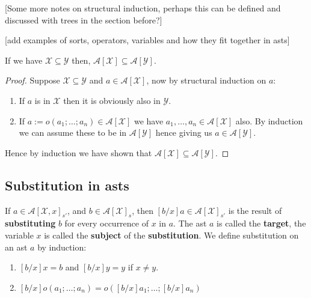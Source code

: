 [Some more notes on structural induction, perhaps this can be defined and discussed with trees in the section before?]

[add examples of sorts, operators, variables and how they fit together in asts]

\begin{lemma}
    If we have $\mathcal{X} \subseteq \mathcal{Y}$ then, $\mathcal{A}[\mathcal{X}] \subseteq \mathcal{A}[\mathcal{Y}]$.
\end{lemma}
\begin{proof}
    Suppose $\mathcal{X} \subseteq \mathcal{Y}$ and $a \in \mathcal{A}[\mathcal{X}]$, now by structural induction on $a$:
    
    \begin{enumerate}
        \item If $a$ is in $\mathcal{X}$ then it is obviously also in $\mathcal{Y}$.
        \item If $a := o(a_1;\dots;a_n) \in \mathcal{A}[\mathcal{X}]$ we have $a_1, \dots, a_n\in \mathcal{A}[\mathcal{X}]$ also. By induction we can assume these to be in $\mathcal{A}[\mathcal{Y}]$ hence giving us $a \in \mathcal{A}[\mathcal{Y}]$.
    \end{enumerate}
    
    Hence by induction we have shown that $\mathcal{A}[\mathcal{X}] \subseteq \mathcal{A}[\mathcal{Y}]$.
\end{proof}

\subsection{Substitution in asts}

\begin{defin}[Substitution]\label{sub}
    If $a \in \mathcal{A}[\mathcal{X},x]_{s'}$, and $b \in \mathcal{A}[\mathcal{X}]_s$, then $[b/x]a \in \mathcal{A}[\mathcal{X}]_{s'}$ is the result of \textbf{substituting} $b$ for every occurrence of $x$ in $a$. The ast $a$ is called the \textbf{target}, the variable $x$ is called the \textbf{subject} of the \textbf{substitution}. We define substitution on an ast $a$ by induction:
    \begin{enumerate}
        \item $[b/x]x = b$ and $[b/x]y = y$ if $x\ne y$.
        \item $[b/x]o(a_1;\dots;a_n)=o([b/x]a_1;\dots;[b/x]a_n)$
    \end{enumerate}
\end{defin}

